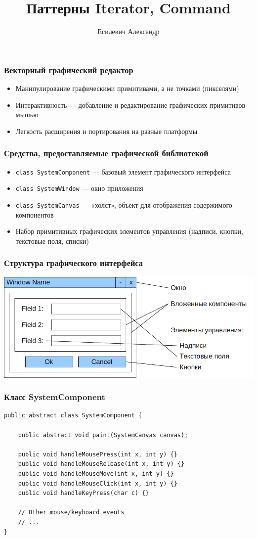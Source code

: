 \documentclass[handout]{beamer}
\title{Паттерны Iterator, Command}
\author{Есилевич Александр}
\begin{document}
\maketitle

\begin{frame}[fragile]
\frametitle{Векторный графический редактор}
\begin{itemize}
\item Манипулирование графическими примитивами, а не точками (пикселями)
\item Интерактивность — добавление и редактирование графических примитивов мышью
\item Легкость расширения и портирования на разные платформы
\end{itemize}
\end{frame}


\begin{frame}[fragile]
\frametitle{Средства, предоставляемые графической библиотекой}
\begin{itemize}
\item \lstinline{class SystemComponent} — базовый элемент графического интерфейса
\item \lstinline{class SystemWindow} — окно приложения
\item \lstinline{class SystemCanvas} — «холст», объект для отображения содержимого компонентов
\item Набор примитивных графических элементов управления (надписи, кнопки, текстовые поля, списки)
\end{itemize}
\end{frame}


\begin{frame}[fragile]
\frametitle{Структура графического интерфейса}
\includegraphics[scale=0.5]{window.png}
\end{frame}


\begin{frame}[fragile]
\frametitle{Класс SystemComponent}
\begin{lstlisting}
public abstract class SystemComponent {

    public abstract void paint(SystemCanvas canvas);

    public void handleMousePress(int x, int y) {}
    public void handleMouseRelease(int x, int y) {}
    public void handleMouseMove(int x, int y) {}
    public void handleMouseClick(int x, int y) {}
    public void handleKeyPress(char c) {}

    // Other mouse/keyboard events
    // ...
}
\end{lstlisting}
\end{frame}
\end{document}
